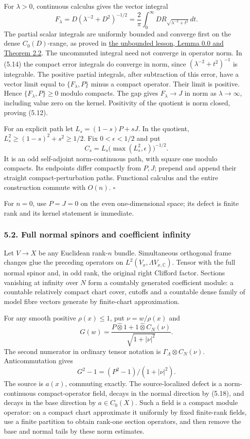 \documentclass[
  11pt,
]{article}
\begin{document}
For \(\lambda>0\), continuous calculus gives the vector integral \[
F_\lambda=D(\lambda^{-2}+D^2)^{-1/2}
=\frac2\pi\int_0^\infty DR_{\sqrt{\lambda^{-2}+t^2}}\,dt .
\tag{5.15}
\] The partial scalar integrals are uniformly bounded and converge first
on the dense \(C_0(D)\)-range, as proved in
\href{KT-KK-11.html\#0-regular-calculus-localization-and-compact-supports}{the
unbounded lesson, Lemma 0.0 and Theorem 2.2}. The uncommuted integral
need not converge in operator norm. In (5.14) the compact error
integrals do converge in norm, since \((\lambda^{-2}+t^2)^{-1}\) is
integrable. The positive partial integrals, after subtraction of this
error, have a vector limit equal to \(\{F_\lambda,P\}\) minus a compact
operator. Their limit is positive. Hence \(\{F_\lambda,P\}\geq0\) modulo
compacts. The gap gives \(F_\lambda\to J\) in norm as
\(\lambda\to\infty\), including value zero on the kernel. Positivity of
the quotient is norm closed, proving (5.12).

For an explicit path let \(L_s=(1-s)P+sJ\). In the quotient,
\(L_s^2\geq(1-s)^2+s^2\geq1/2\). Fix \(0<\epsilon<1/2\) and put \[
C_s=L_s\bigl(\max(L_s^2,\epsilon)\bigr)^{-1/2}.
\tag{5.16}
\] It is an odd self-adjoint norm-continuous path, with square one
modulo compacts. Its endpoints differ compactly from \(P,J\); prepend
and append their straight compact-perturbation paths. Functional
calculus and the entire construction commute with \(O(n)\). \(\square\)

For \(n=0\), use \(P=J=0\) on the even one-dimensional space; its defect
is finite rank and its kernel statement is immediate.

\subsubsection{5.2. Full normal spinors and coefficient
infinity}\label{full-normal-spinors-and-coefficient-infinity}

Let \(V\to X\) be any Euclidean rank-\(n\) bundle. Simultaneous
orthogonal frame changes glue the preceding operators on
\(L^2(V_x,\Lambda V_{x,\mathbb C})\). Tensor with the full normal spinor
and, in odd rank, the original right Clifford factor. Sections vanishing
at infinity over \(N\) form a countably generated coefficient module: a
countable relatively compact chart cover, cutoffs and a countable dense
family of model fibre vectors generate by finite-chart approximation.

For any smooth positive \(\rho(x)\leq1\), put \(\nu=w/\rho(x)\) and \[
G(w)=\frac{P\widehat\otimes1+1\widehat\otimes C_N(\nu)}
{\sqrt{1+|\nu|^2}} .
\tag{5.17}
\] The second numerator in ordinary tensor notation is
\(\Gamma_\Lambda\otimes C_N(\nu)\). Anticommutation gives \[
G^2-1=(P^2-1)/(1+|\nu|^2).
\tag{5.18}
\] The source is \(a(x)\), commuting exactly. The source-localized
defect is a norm-continuous compact-operator field, decays in the normal
direction by (5.18), and decays in the base direction by
\(a\in C_0(X)\). Such a field is a compact module operator: on a compact
chart approximate it uniformly by fixed finite-rank fields, use a finite
partition to obtain rank-one section operators, and then remove the base
and normal tails by these norm estimates.
\end{document}
